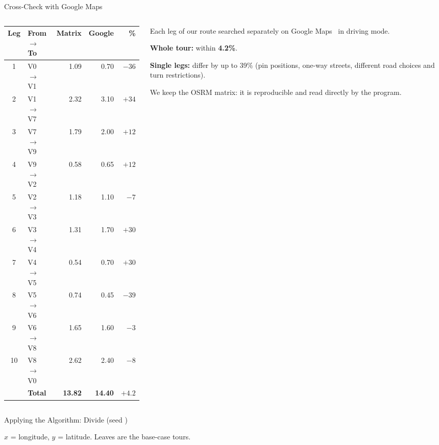 \begin{frame}{Cross-Check with Google Maps}
  \begin{columns}[T]
    \begin{column}{0.55\textwidth}
      \centering
      \scriptsize
      \setlength{\tabcolsep}{4pt}
      \begin{tabular}{c l r r r}
        \toprule
        \textbf{Leg} & \textbf{From $\to$ To} & \textbf{Matrix} & \textbf{Google} & \textbf{\%} \\
        \midrule
        1 & V0 $\to$ V1 & 1.09 & 0.70 & $-36$ \\
        2 & V1 $\to$ V7 & 2.32 & 3.10 & $+34$ \\
        3 & V7 $\to$ V9 & 1.79 & 2.00 & $+12$ \\
        4 & V9 $\to$ V2 & 0.58 & 0.65 & $+12$ \\
        5 & V2 $\to$ V3 & 1.18 & 1.10 & $-7$ \\
        6 & V3 $\to$ V4 & 1.31 & 1.70 & $+30$ \\
        7 & V4 $\to$ V5 & 0.54 & 0.70 & $+30$ \\
        8 & V5 $\to$ V6 & 0.74 & 0.45 & $-39$ \\
        9 & V6 $\to$ V8 & 1.65 & 1.60 & $-3$ \\
        10 & V8 $\to$ V0 & 2.62 & 2.40 & $-8$ \\
        \midrule
        & \textbf{Total} & \textbf{13.82} & \textbf{14.40} & $+4.2$ \\
        \bottomrule
      \end{tabular}
    \end{column}
    \begin{column}{0.42\textwidth}
      \footnotesize
      Each leg of our route searched separately on Google Maps~\cite{googlemaps} in driving mode.
      \medskip

      \textbf{Whole tour:} within \textbf{4.2\%}.

      \textbf{Single legs:} differ by up to 39\% (pin positions, one-way streets, different road
      choices and turn restrictions).
      \medskip

      We keep the OSRM matrix: it is reproducible and read directly by the program.
    \end{column}
  \end{columns}
\end{frame}

\begin{frame}{Applying the Algorithm: Divide (seed \DCSeed{})}
  \centering
  \resizebox{0.95\textwidth}{!}{}

  \footnotesize $x$ = longitude, $y$ = latitude. Leaves are the base-case tours.
\end{frame}


